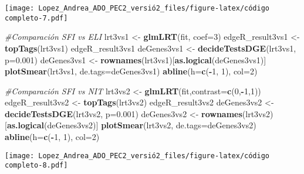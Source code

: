 \documentclass[
]{article}
\newenvironment{Shaded}{\begin{snugshade}}{\end{snugshade}}
\newcommand{\CommentTok}[1]{\textcolor[rgb]{0.56,0.35,0.01}{\textit{#1}}}
\newcommand{\DataTypeTok}[1]{\textcolor[rgb]{0.13,0.29,0.53}{#1}}
\newcommand{\DecValTok}[1]{\textcolor[rgb]{0.00,0.00,0.81}{#1}}
\newcommand{\FloatTok}[1]{\textcolor[rgb]{0.00,0.00,0.81}{#1}}
\newcommand{\KeywordTok}[1]{\textcolor[rgb]{0.13,0.29,0.53}{\textbf{#1}}}
\newcommand{\NormalTok}[1]{#1}
\newcommand{\OperatorTok}[1]{\textcolor[rgb]{0.81,0.36,0.00}{\textbf{#1}}}
\newcommand{\StringTok}[1]{\textcolor[rgb]{0.31,0.60,0.02}{#1}}
\begin{document}
\texttt{[image: Lopez\_Andrea\_ADO\_PEC2\_versió2\_files/figure-latex/código completo-7.pdf]}

\begin{Shaded}
\begin{Highlighting}[]
\CommentTok{#Comparación SFI vs ELI}
\NormalTok{lrt3vs1 <-}\StringTok{ }\KeywordTok{glmLRT}\NormalTok{(fit, }\DataTypeTok{coef=}\DecValTok{3}\NormalTok{)}
\NormalTok{edgeR_result3vs1 <-}\StringTok{ }\KeywordTok{topTags}\NormalTok{(lrt3vs1)}
\NormalTok{edgeR_result3vs1}
\NormalTok{deGenes3vs1 <-}\StringTok{ }\KeywordTok{decideTestsDGE}\NormalTok{(lrt3vs1, }\DataTypeTok{p=}\FloatTok{0.001}\NormalTok{)}
\NormalTok{deGenes3vs1 <-}\StringTok{ }\KeywordTok{rownames}\NormalTok{(lrt3vs1)[}\KeywordTok{as.logical}\NormalTok{(deGenes3vs1)]}
\KeywordTok{plotSmear}\NormalTok{(lrt3vs1, }\DataTypeTok{de.tags=}\NormalTok{deGenes3vs1)}
\KeywordTok{abline}\NormalTok{(}\DataTypeTok{h=}\KeywordTok{c}\NormalTok{(}\OperatorTok{-}\DecValTok{1}\NormalTok{, }\DecValTok{1}\NormalTok{), }\DataTypeTok{col=}\DecValTok{2}\NormalTok{)}

\CommentTok{#Comparación SFI vs NIT}
\NormalTok{lrt3vs2 <-}\StringTok{ }\KeywordTok{glmLRT}\NormalTok{(fit,}\DataTypeTok{contrast=}\KeywordTok{c}\NormalTok{(}\DecValTok{0}\NormalTok{,}\OperatorTok{-}\DecValTok{1}\NormalTok{,}\DecValTok{1}\NormalTok{))}
\NormalTok{edgeR_result3vs2 <-}\StringTok{ }\KeywordTok{topTags}\NormalTok{(lrt3vs2)}
\NormalTok{edgeR_result3vs2}
\NormalTok{deGenes3vs2 <-}\StringTok{ }\KeywordTok{decideTestsDGE}\NormalTok{(lrt3vs2, }\DataTypeTok{p=}\FloatTok{0.001}\NormalTok{)}
\NormalTok{deGenes3vs2 <-}\StringTok{ }\KeywordTok{rownames}\NormalTok{(lrt3vs2)[}\KeywordTok{as.logical}\NormalTok{(deGenes3vs2)]}
\KeywordTok{plotSmear}\NormalTok{(lrt3vs2, }\DataTypeTok{de.tags=}\NormalTok{deGenes3vs2)}
\KeywordTok{abline}\NormalTok{(}\DataTypeTok{h=}\KeywordTok{c}\NormalTok{(}\OperatorTok{-}\DecValTok{1}\NormalTok{, }\DecValTok{1}\NormalTok{), }\DataTypeTok{col=}\DecValTok{2}\NormalTok{)}
\end{Highlighting}
\end{Shaded}

\texttt{[image: Lopez\_Andrea\_ADO\_PEC2\_versió2\_files/figure-latex/código completo-8.pdf]}

\begin{Shaded}
\end{Shaded}
\end{document}

